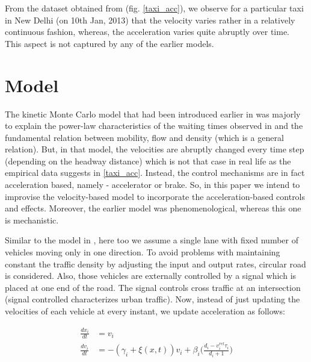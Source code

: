 \documentclass[conference]{IEEEtran}
\begin{document}
From the dataset obtained from \cite{traffline} (fig. \ref{taxi_acc}), we observe for a particular taxi in New Delhi (on 10th Jan, 2013) that the velocity varies rather in a relatively continuous fashion, whereas, the acceleration varies quite abruptly over time. This aspect is not captured by any of the earlier models.



\section{Model}
The kinetic Monte Carlo model that had been introduced earlier in \cite{Majith2016} was majorly to explain the power-law characteristics of the waiting times observed in \cite{Majith2015} and the fundamental relation between mobility, flow and density (which is a general relation). But, in that model, the velocities are abruptly changed every time step (depending on the headway distance) which is not that case in real life as the empirical data suggests in \ref{taxi_acc}. Instead, the control mechanisms are in fact acceleration based, namely - accelerator or brake. So, in this paper we intend to improvise the velocity-based model to incorporate the acceleration-based controls and effects. Moreover, the earlier model was phenomenological, whereas this one is mechanistic. %

Similar to the model in \cite{Majith2016}, here too we assume a single lane with fixed number of vehicles moving only in one direction. %
To avoid problems with maintaining constant the traffic density by adjusting the input and output rates, circular road is considered. Also, those vehicles are externally controlled by a signal which is placed at one end of the road. %
The signal controls cross traffic at an intersection (signal controlled characterizes urban traffic). Now, instead of just updating the velocities of each vehicle at every instant, we update acceleration as follows:

\begin{equation}
\begin{split}
    \frac{dx_{i}}{dt} &= v_{i}\\
    \frac{dv_{i}}{dt} &= -(\gamma_{i} + \xi(x,t))v_{i} + \beta_{i}\bigg(\frac{d_{i}-v^{rel}_{i}\tau_{i}}{d_{i}+1}\bigg)
\end{split}
\label{dxdv}\end{equation}
\end{document}
